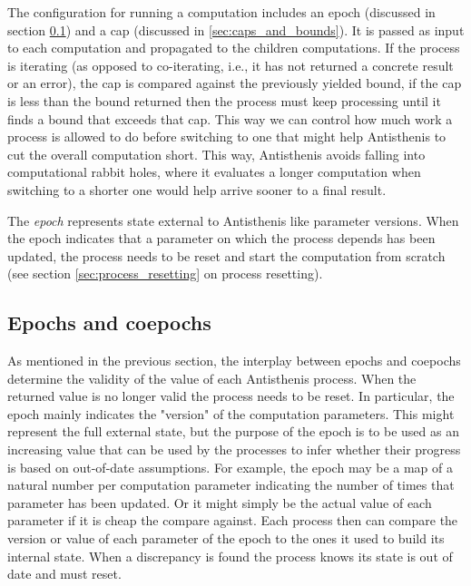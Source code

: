 The configuration for running a computation includes an epoch
(discussed in section \ref{sec:epochs_coepochs}) and a cap (discussed
in \ref{sec:caps_and_bounds}). It is passed as input to each
computation and propagated to the children computations. If the process
is iterating (as opposed to co-iterating, i.e., it has not returned a
concrete result or an error), the cap is compared against the previously
yielded bound, if the cap is less than the bound returned then the
process must keep processing until it finds a bound that exceeds that
cap. This way we can control how much work a process is allowed to do
before switching to one that might help Antisthenis to cut the overall
computation short. This way, Antisthenis avoids falling into
computational rabbit holes, where it evaluates a longer computation when
switching to a shorter one would help arrive sooner to a final result.

The \emph{epoch} represents state external to Antisthenis like
parameter versions. When the epoch indicates that a parameter on which
the process depends has been updated, the process needs to be reset
and start the computation from scratch (see section
\ref{sec:process_resetting} on process resetting).


\subsection{Epochs and coepochs}
\label{sec:epochs_coepochs}

As mentioned in the previous section, the interplay between epochs and
coepochs determine the validity of the value of each Antisthenis
process. When the returned value is no longer valid the process needs
to be reset. In particular, the epoch mainly indicates the "version"
of the computation parameters. This might represent the full external
state, but the purpose of the epoch is to be used as an increasing
value that can be used by the processes to infer whether their
progress is based on out-of-date assumptions. For example, the epoch
may be a map of a natural number per computation parameter indicating
the number of times that parameter has been updated. Or it might
simply be the actual value of each parameter if it is cheap the
compare against. Each process then can compare the version or value of
each parameter of the epoch to the ones it used to build its internal
state. When a discrepancy is found the process knows its state is out
of date and must reset.

